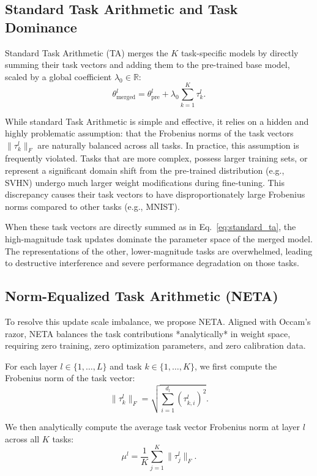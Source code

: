 \subsection{Standard Task Arithmetic and Task Dominance}
Standard Task Arithmetic (TA) merges the $K$ task-specific models by directly summing their task vectors and adding them to the pre-trained base model, scaled by a global coefficient $\lambda_0 \in \mathbb{R}$:
\begin{equation}
\label{eq:standard_ta}
\theta_{\text{merged}}^l = \theta_{\text{pre}}^l + \lambda_0 \sum_{k=1}^K \tau_k^l.
\end{equation}

While standard Task Arithmetic is simple and effective, it relies on a hidden and highly problematic assumption: that the Frobenius norms of the task vectors $\|\tau_k^l\|_F$ are naturally balanced across all tasks. In practice, this assumption is frequently violated. Tasks that are more complex, possess larger training sets, or represent a significant domain shift from the pre-trained distribution (e.g., SVHN) undergo much larger weight modifications during fine-tuning. This discrepancy causes their task vectors to have disproportionately large Frobenius norms compared to other tasks (e.g., MNIST).

When these task vectors are directly summed as in Eq.~\ref{eq:standard_ta}, the high-magnitude task updates dominate the parameter space of the merged model. The representations of the other, lower-magnitude tasks are overwhelmed, leading to destructive interference and severe performance degradation on those tasks.

\subsection{Norm-Equalized Task Arithmetic (NETA)}
To resolve this update scale imbalance, we propose NETA. Aligned with Occam's razor, NETA balances the task contributions *analytically* in weight space, requiring zero training, zero optimization parameters, and zero calibration data.

For each layer $l \in \{1, \dots, L\}$ and task $k \in \{1, \dots, K\}$, we first compute the Frobenius norm of the task vector:
\begin{equation}
\label{eq:frob_norm}
\|\tau_k^l\|_F = \sqrt{\sum_{i=1}^{d_l} (\tau_{k, i}^l)^2}.
\end{equation}

We then analytically compute the average task vector Frobenius norm at layer $l$ across all $K$ tasks:
\begin{equation}
\label{eq:mean_norm}
\mu^l = \frac{1}{K} \sum_{j=1}^K \|\tau_j^l\|_F.
\end{equation}

